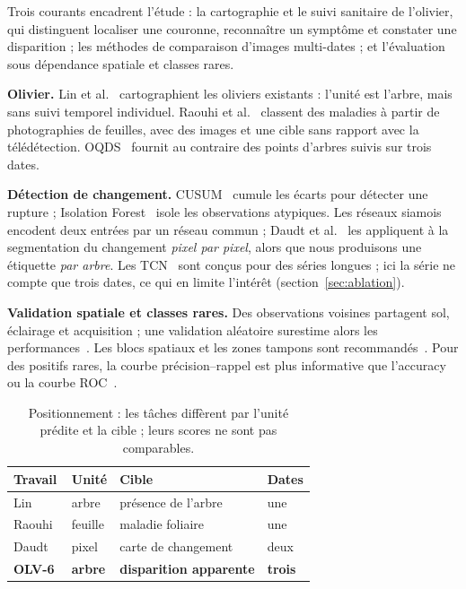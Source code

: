 \documentclass[10pt,a4paper,twocolumn]{article}
\makeatletter
\renewcommand\section{\@startsection{section}{1}{\z@}{-1.6ex plus -.4ex}{0.7ex}{\normalfont\large\bfseries\color{olive}}}
\makeatother
\begin{document}
\section{Travaux connexes}
Trois courants encadrent l'étude : la cartographie et le suivi sanitaire de l'olivier, qui distinguent localiser une couronne,
reconnaître un symptôme et constater une disparition ; les méthodes de comparaison d'images multi-dates ; et l'évaluation sous
dépendance spatiale et classes rares.

\textbf{Olivier.} Lin et al.~\cite{lin} cartographient les oliviers existants : l'unité est l'arbre, mais sans suivi temporel
individuel. Raouhi et al.~\cite{raouhi} classent des maladies à partir de photographies de feuilles, avec des images et une cible
sans rapport avec la télédétection. OQDS~\cite{oqds} fournit au contraire des points d'arbres suivis sur trois dates.

\textbf{Détection de changement.} CUSUM~\cite{page} cumule les écarts pour détecter une rupture ; Isolation Forest~\cite{iforest}
isole les observations atypiques. Les réseaux siamois~\cite{bromley} encodent deux entrées par un réseau commun ; Daudt et
al.~\cite{daudt} les appliquent à la segmentation du changement \emph{pixel par pixel}, alors que nous produisons une étiquette
\emph{par arbre}. Les TCN~\cite{bai} sont conçus pour des séries longues ; ici la série ne compte que trois dates, ce qui en limite
l'intérêt (section~\ref{sec:ablation}).

\textbf{Validation spatiale et classes rares.} Des observations voisines partagent sol, éclairage et acquisition ; une
validation aléatoire surestime alors les performances~\cite{roberts}. Les blocs spatiaux et les zones tampons sont
recommandés~\cite{valavi}. Pour des positifs rares, la courbe précision--rappel est plus informative que l'accuracy ou la courbe
ROC~\cite{saito}.

\begin{table}[t]
\centering\small
\caption{Positionnement : les tâches diffèrent par l'unité prédite et la cible ; leurs scores ne sont pas comparables.}
\label{tab:related}
\setlength{\tabcolsep}{3pt}
\begin{tabular}{@{}L{1.5cm}L{1.0cm}L{2.75cm}L{1.0cm}@{}}
\toprule
Travail & Unité & Cible & Dates \\
\midrule
Lin~\cite{lin} & arbre & présence de l'arbre & une \\
Raouhi~\cite{raouhi} & feuille & maladie foliaire & une \\
Daudt~\cite{daudt} & pixel & carte de changement & deux \\
\textbf{OLV-6} & \textbf{arbre} & \textbf{disparition apparente} & \textbf{trois} \\
\bottomrule
\end{tabular}
\end{table}
\end{document}
